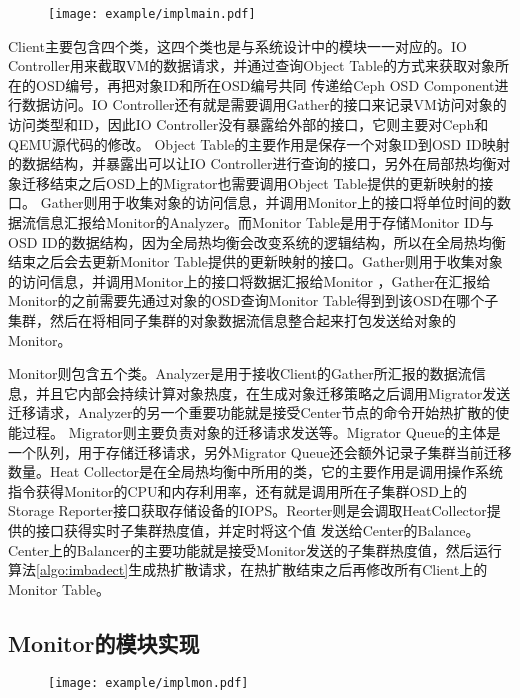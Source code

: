\begin{figure}[!htp]
    \centering
    \texttt{[image: example/implmain.pdf]}
\end{figure}

Client主要包含四个类，这四个类也是与系统设计中的模块一一对应的。IO Controller用来截取VM的数据请求，并通过查询Object Table的方式来获取对象所在的OSD编号，再把对象ID和所在OSD编号共同
传递给Ceph OSD Component进行数据访问。IO Controller还有就是需要调用Gather的接口来记录VM访问对象的访问类型和ID，因此IO Controller没有暴露给外部的接口，它则主要对Ceph和QEMU源代码的修改。
Object Table的主要作用是保存一个对象ID到OSD ID映射的数据结构，并暴露出可以让IO Controller进行查询的接口，另外在局部热均衡对象迁移结束之后OSD上的Migrator也需要调用Object Table提供的更新映射的接口。
Gather则用于收集对象的访问信息，并调用Monitor上的接口将单位时间的数据流信息汇报给Monitor的Analyzer。而Monitor Table是用于存储Monitor ID与OSD ID的数据结构，因为全局热均衡会改变系统的逻辑结构，所以在全局热均衡结束之后会去更新Monitor Table提供的更新映射的接口。Gather则用于收集对象的访问信息，并调用Monitor上的接口将数据汇报给Monitor
，Gather在汇报给Monitor的之前需要先通过对象的OSD查询Monitor Table得到到该OSD在哪个子集群，然后在将相同子集群的对象数据流信息整合起来打包发送给对象的Monitor。

Monitor则包含五个类。Analyzer是用于接收Client的Gather所汇报的数据流信息，并且它内部会持续计算对象热度，在生成对象迁移策略之后调用Migrator发送迁移请求，Analyzer的另一个重要功能就是接受Center节点的命令开始热扩散的使能过程。
Migrator则主要负责对象的迁移请求发送等。Migrator Queue的主体是一个队列，用于存储迁移请求，另外Migrator Queue还会额外记录子集群当前迁移数量。Heat Collector是在全局热均衡中所用的类，它的主要作用是调用操作系统
指令获得Monitor的CPU和内存利用率，还有就是调用所在子集群OSD上的Storage Reporter接口获取存储设备的IOPS。Reorter则是会调取HeatCollector提供的接口获得实时子集群热度值，并定时将这个值
发送给Center的Balance。Center上的Balancer的主要功能就是接受Monitor发送的子集群热度值，然后运行算法\ref{algo:imbadect}生成热扩散请求，在热扩散结束之后再修改所有Client上的Monitor Table。


\subsection{Monitor的模块实现}
\begin{figure}[!htp]
    \centering
    \texttt{[image: example/implmon.pdf]}
\end{figure}

